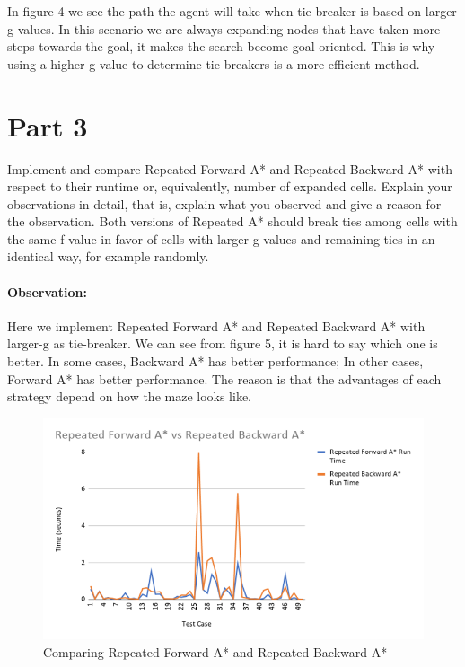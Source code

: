 \documentclass[11pt]{report}
\begin{document}
In figure 4 we see the path the agent will take when tie breaker is based on larger g-values. In this scenario we are always expanding nodes that have taken more steps towards the goal, it makes the search become goal-oriented. This is why using a higher g-value to determine tie breakers is a more efficient method.

\newpage


\section*{Part 3}
Implement and compare Repeated Forward A* and Repeated Backward A* with respect to their runtime or, equivalently, number of expanded cells. Explain your observations in detail, that is, explain what you observed and give a reason for the observation. Both versions of Repeated A* should break ties among cells with the same f-value in favor of cells with larger g-values and remaining ties in an identical way, for example randomly.


\paragraph{Observation:}
Here we implement Repeated Forward A* and Repeated Backward A* with larger-g as tie-breaker. We can see from figure 5, it is hard to say which one is better. In some cases, Backward A* has better performance; In other cases, Forward A* has better performance. The reason is that the advantages of each strategy depend on how the maze looks like.

\begin{figure}[h]
\begin{center}
\includegraphics[width = 1\textwidth]{Part3_1.jpg} 
\end{center}
\caption{Comparing Repeated Forward A* and Repeated Backward A*}
\end{figure}
\end{document}

